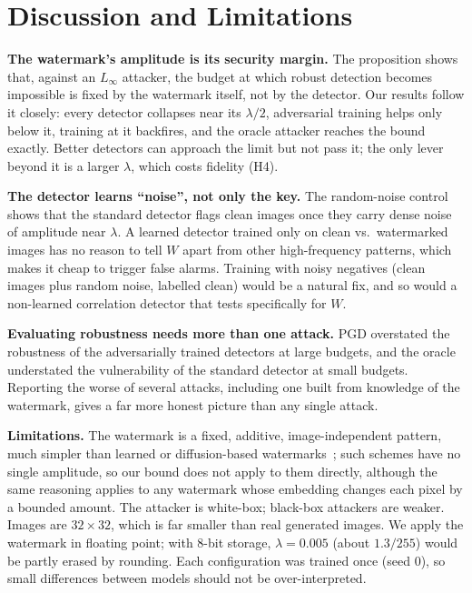 \documentclass[sigconf, nonacm]{acmart}
\begin{document}
\section{Discussion and Limitations}
\textbf{The watermark's amplitude is its security margin.} The proposition shows that, against
an $L_\infty$ attacker, the budget at which robust detection becomes impossible is fixed by the
watermark itself, not by the detector. Our results follow it closely: every detector collapses
near its $\lambda/2$, adversarial training helps only below it, training at it backfires, and the
oracle attacker reaches the bound exactly. Better detectors can approach the limit but not pass it;
the only lever beyond it is a larger $\lambda$, which costs fidelity (H4).

\textbf{The detector learns ``noise'', not only the key.} The random-noise control shows that the
standard detector flags clean images once they carry dense noise of amplitude near $\lambda$. A
learned detector trained only on clean vs.\ watermarked images has no reason to tell $W$ apart
from other high-frequency patterns, which makes it cheap to trigger false alarms. Training with
noisy negatives (clean images plus random noise, labelled clean) would be a natural fix, and so
would a non-learned correlation detector that tests specifically for $W$.

\textbf{Evaluating robustness needs more than one attack.} PGD overstated the robustness of the
adversarially trained detectors at large budgets, and the oracle understated the vulnerability of
the standard detector at small budgets. Reporting the worse of several attacks, including one built
from knowledge of the watermark, gives a far more honest picture than any single attack.

\textbf{Limitations.} The watermark is a fixed, additive, image-independent pattern, much simpler
than learned or diffusion-based watermarks~\cite{paper4,paper5,paper6}; such schemes have no
single amplitude, so our bound does not apply to them directly, although the same reasoning
applies to any watermark whose embedding changes each pixel by a bounded amount. The attacker is
white-box; black-box attackers are weaker. Images are $32\times32$, which is far smaller than real
generated images. We apply the watermark in floating point; with 8-bit storage, $\lambda=0.005$
(about $1.3/255$) would be partly erased by rounding. Each configuration was trained once (seed 0),
so small differences between models should not be over-interpreted.
\end{document}
